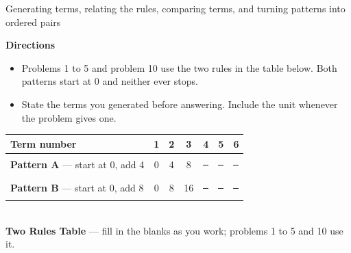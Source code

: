 \documentclass[12pt]{article}
\begin{document}

\begin{center}
{\small Generating terms, relating the rules, comparing terms, and turning patterns into ordered pairs}
\end{center}

\noindent\textbf{Directions}
\begin{itemize}[leftmargin=0.9cm, itemsep=1pt, topsep=2pt]
  \item Problems 1 to 5 and problem 10 use the two rules in the table below. Both patterns start at 0 and neither ever stops.
  \item State the terms you generated before answering. Include the unit whenever the problem gives one.
\end{itemize}

\vspace{0.15cm}
\begin{center}
\begin{tabular}{|l|c|c|c|c|c|c|}
\hline
\textbf{Term number} & 1 & 2 & 3 & 4 & 5 & 6 \\ \hline
\textbf{Pattern A} --- start at 0, add 4 & 0 & 4 & 8 & \rule{0.9cm}{0pt} & \rule{0.9cm}{0pt} & \rule{0.9cm}{0pt} \\[2pt] \hline
\textbf{Pattern B} --- start at 0, add 8 & 0 & 8 & 16 & \rule{0.9cm}{0pt} & \rule{0.9cm}{0pt} & \rule{0.9cm}{0pt} \\[2pt] \hline
\end{tabular}\\[0.2cm]
{\small \textbf{Two Rules Table} --- fill in the blanks as you work; problems 1 to 5 and 10 use it.}
\end{center}

\vspace{0.2cm}





\end{document}
